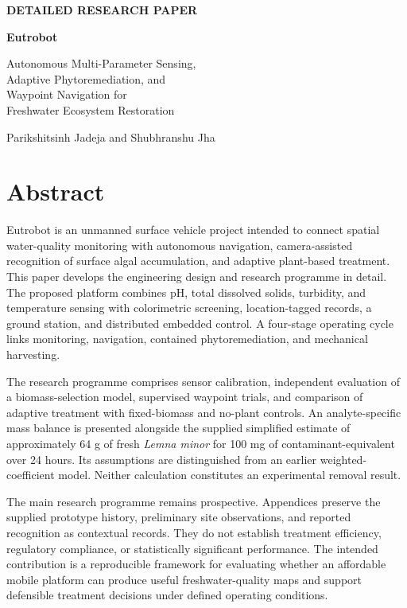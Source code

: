 \documentclass[12pt,a4paper]{article}
\begin{document}
\thispagestyle{empty}
\begin{center}
{\small\bfseries\color{deepblue} DETAILED RESEARCH PAPER}\par
\vspace{12pt}
{\Huge\bfseries Eutrobot}\par
\vspace{10pt}
{\Large Autonomous Multi-Parameter Sensing,\\Adaptive Phytoremediation, and\\Waypoint Navigation for\\Freshwater Ecosystem Restoration}\par
\vspace{16pt}
{\large Parikshitsinh Jadeja and Shubhranshu Jha}
\end{center}
\vspace{12pt}
\section*{Abstract}
Eutrobot is an unmanned surface vehicle project intended to connect spatial water-quality monitoring with autonomous navigation, camera-assisted recognition of surface algal accumulation, and adaptive plant-based treatment. This paper develops the engineering design and research programme in detail. The proposed platform combines pH, total dissolved solids, turbidity, and temperature sensing with colorimetric screening, location-tagged records, a ground station, and distributed embedded control. A four-stage operating cycle links monitoring, navigation, contained phytoremediation, and mechanical harvesting.

The research programme comprises sensor calibration, independent evaluation of a biomass-selection model, supervised waypoint trials, and comparison of adaptive treatment with fixed-biomass and no-plant controls. An analyte-specific mass balance is presented alongside the supplied simplified estimate of approximately 64 g of fresh \textit{Lemna minor} for 100 mg of contaminant-equivalent over 24 hours. Its assumptions are distinguished from an earlier weighted-coefficient model. Neither calculation constitutes an experimental removal result.

The main research programme remains prospective. Appendices preserve the supplied prototype history, preliminary site observations, and reported recognition as contextual records. They do not establish treatment efficiency, regulatory compliance, or statistically significant performance. The intended contribution is a reproducible framework for evaluating whether an affordable mobile platform can produce useful freshwater-quality maps and support defensible treatment decisions under defined operating conditions.
\end{document}
